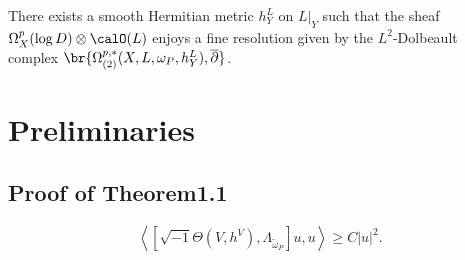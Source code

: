 \documentclass[lang=en,12pt]{beautybook}
\begin{document}
\begin{theorem}
  There exists a smooth Hermitian metric $h^L_Y$ on $L|_Y$ such that the sheaf $\Omega_X^p(\log D)\otimes\calO (L)$ enjoys a fine resolution given by the $L^2$-Dolbeault complex $\br{\Omega^{p,*}_{(2)}(X,L,\omega_P,h^L_Y),\bdd}$.
\end{theorem}

\section{Preliminaries}
\subsection{Proof of Theorem1.1}

\begin{lemma}[][3.3]
  \[ \left\langle \left[ \sqrt{- 1} \Theta (V, h^V), \Lambda_{\tilde{\omega}_P}
      \right] u, u \right\rangle \geqslant C | u |^2 . \]
\end{lemma}
\end{document}
